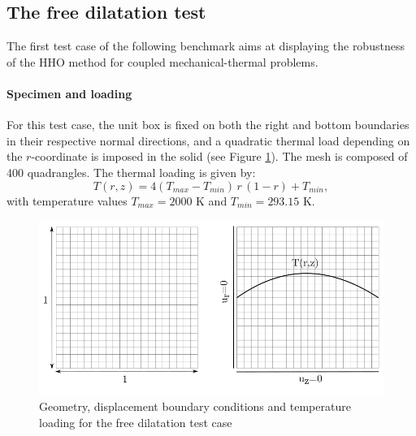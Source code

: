 \subsection{The free dilatation test}
\label{sec_satoh_test}

The first test case of the following benchmark aims at displaying the
robustness of the HHO method for coupled mechanical-thermal problems.

\paragraph{Specimen and loading}

For this test case, the unit box is fixed on both the right and
bottom boundaries in their respective normal directions, and a quadratic
thermal load depending on the $r$-coordinate is imposed in the solid
(see Figure \ref{fig_satoh_setting}). The mesh is composed of 400
quadrangles. The thermal loading is given by:
%
%
%
\begin{equation}
    T(r,z) = 4 (T_{max} - T_{min}) \, r \, (1 - r) + T_{min},
\end{equation}
%
%
%
with temperature values $T_{max} = 2000$ K and $T_{min} = 293.15$ K.

\begin{figure}[H]
    \centering
    \includegraphics[width=10.cm]{../chapter_002_hho_mechanics/drawings/satoh_mesh.png}
    \caption{Geometry, displacement boundary conditions and temperature loading for the free dilatation test case}
    \label{fig_satoh_setting}
\end{figure}

